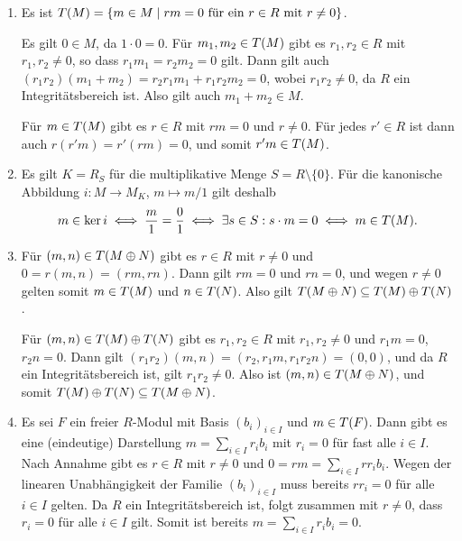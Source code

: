 \begin{solution}
  \begin{enumerate}
    \item
      Es ist $T(M) = \{m \in M \mid \text{$rm = 0$ für ein $r \in R$ mit $r \neq 0$}\}$.
      
      Es gilt $0 \in M$, da $1 \cdot 0 = 0$.
      Für $m_1, m_2 \in T(M)$ gibt es $r_1, r_2 \in R$ mit $r_1, r_2 \neq 0$, so dass $r_1 m_1 = r_2 m_2 = 0$ gilt.
      Dann gilt auch $(r_1 r_2) (m_1 + m_2) = r_2 r_1 m_1 + r_1 r_2 m_2 = 0$, wobei $r_1 r_2 \neq 0$, da $R$ ein Integritätsbereich ist.
      Also gilt auch $m_1 + m_2 \in M$.
      
      Für $m \in T(M)$ gibt es $r \in R$ mit $rm = 0$ und $r \neq 0$.
      Für jedes $r' \in R$ ist dann auch $r (r' m) = r' (rm) = 0$, und somit $r' m \in T(M)$.
      
    \item
      Es gilt $K = R_S$ für die multiplikative Menge $S = R \setminus \{0\}$.
      Für die kanonische Abbildung $i \colon M \to M_K$, $m \mapsto m/1$ gilt deshalb
      \[
              m \in \ker i
        \iff  \frac{m}{1} = \frac{0}{1}
        \iff  \exists s \in S : s \cdot m = 0
        \iff  m \in T(M).
      \]

    \item
      Für $(m, n) \in T(M \oplus N)$ gibt es $r \in R$ mit $r \neq 0$ und $0 = r(m,n) = (rm,rn)$.
      Dann gilt $rm = 0$ und $rn = 0$, und wegen $r \neq 0$ gelten somit $m \in T(M)$ und $n \in T(N)$.
      Also gilt $T(M \oplus N) \subseteq T(M) \oplus T(N)$.
      
      Für $(m, n) \in T(M) \oplus T(N)$ gibt es $r_1, r_2 \in R$ mit $r_1, r_2 \neq 0$ und $r_1 m = 0$, $r_2 n = 0$.
      Dann gilt $(r_1 r_2) (m, n) = (r_2, r_1 m, r_1 r_2 n) = (0,0)$, und da $R$ ein Integritätsbereich ist, gilt $r_1 r_2 \neq 0$.
      Also ist $(m,n) \in T(M \oplus N)$, und somit $T(M) \oplus T(N) \subseteq T(M \oplus N)$.
    
    \item
      Es sei $F$ ein freier $R$-Modul mit Basis $(b_i)_{i \in I}$ und $m \in T(F)$.
      Dann gibt es eine (eindeutige) Darstellung $m = \sum_{i \in I} r_i b_i$ mit $r_i = 0$ für fast alle $i \in I$.
      Nach Annahme gibt es $r \in R$ mit $r \neq 0$ und $0 = rm = \sum_{i \in I} r r_i b_i$.
      Wegen der linearen Unabhängigkeit der Familie $(b_i)_{i \in I}$ muss bereits $r r_i = 0$ für alle $i \in I$ gelten.
      Da $R$ ein Integritätsbereich ist, folgt zusammen mit $r \neq 0$, dass $r_i = 0$ für alle $i \in I$ gilt.
      Somit ist bereits $m = \sum_{i \in I} r_i b_i = 0$.
      

\end{enumerate}
\end{solution}
